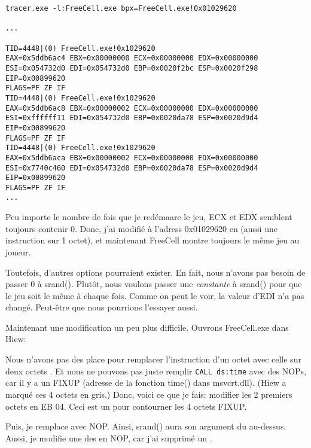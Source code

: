 \begin{lstlisting}
tracer.exe -l:FreeCell.exe bpx=FreeCell.exe!0x01029620

...

TID=4448|(0) FreeCell.exe!0x1029620
EAX=0x5ddb6ac4 EBX=0x00000000 ECX=0x00000000 EDX=0x00000000
ESI=0x054732d0 EDI=0x054732d0 EBP=0x0020f2bc ESP=0x0020f298
EIP=0x00899620
FLAGS=PF ZF IF
TID=4448|(0) FreeCell.exe!0x1029620
EAX=0x5ddb6ac8 EBX=0x00000002 ECX=0x00000000 EDX=0x00000000
ESI=0xffffff11 EDI=0x054732d0 EBP=0x0020da78 ESP=0x0020d9d4
EIP=0x00899620
FLAGS=PF ZF IF
TID=4448|(0) FreeCell.exe!0x1029620
EAX=0x5ddb6aca EBX=0x00000002 ECX=0x00000000 EDX=0x00000000
ESI=0x7740c460 EDI=0x054732d0 EBP=0x0020da78 ESP=0x0020d9d4
EIP=0x00899620
FLAGS=PF ZF IF
...
\end{lstlisting}

Peu importe le nombre de fois que je redémaare le jeu, ECX et EDX semblent toujours
contenir 0.
Donc, j'ai modifié  à l'adress 0x01029620 en  (aussi
une instruction sur 1 octet), et maintenant FreeCell montre toujours le même jeu
au joueur.

Toutefois, d'autres options pourraient exister.
En fait, nous n'avons pas besoin de passer 0 à srand().
Plutôt, nous voulons passer une \emph{constante} à srand() pour que le jeu soit le
même à chaque fois.
Comme on peut le voir, la valeur d'EDI n'a pas changé. Peut-être que nous pourrions
l'essayer aussi.

Maintenant une modification un peu plus difficile.
Ouvrons FreeCell.exe dans Hiew:

\begin{figure}[H]
\centering
{}
\end{figure}

Nous n'avons pas des place pour remplacer l'instruction d'un octet 
avec celle sur deux octets .
Et nous ne pouvons pas juste remplir \verb|CALL ds:time| avec des \ac{NOP}s, car
il y a un FIXUP (adresse de la fonction time() dans msvcrt.dll).
(Hiew a marqué ces 4 octets en gris.)
Donc, voici ce que je fais: modifier les 2 premiers octets en EB 04. Ceci est un
 pour contourner les 4 octets FIXUP.

\begin{figure}[H]
\centering
{}
\end{figure}

Puis, je remplace  avec \ac{NOP}. Ainsi, srand() aura son argument du  au-dessus.
Aussi, je modifie une des  en \ac{NOP}, car j'ai supprimé un .

